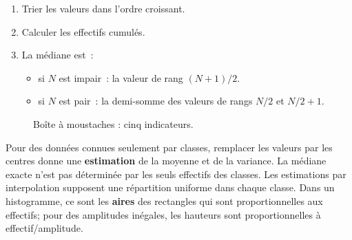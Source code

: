 \begin{methode}
\begin{enumerate}
  \item Trier les valeurs dans l'ordre croissant.
  \item Calculer les effectifs cumul\'es.
  \item La m\'ediane est~:
    \begin{itemize}
      \item si $N$ est impair~: la valeur de rang $(N+1)/2$.
      \item si $N$ est pair~: la demi-somme des valeurs de rangs $N/2$ et $N/2+1$.
    \end{itemize}
\end{enumerate}
\end{methode}

\begin{figure}[H]
\centering
{}
\caption{\ExtensionTTen{} Bo\^ite \`a moustaches : cinq indicateurs.}
\end{figure}

\begin{remarque}
Pour des donn\'ees connues seulement par classes, remplacer les valeurs par
les centres donne une \textbf{estimation} de la moyenne et de la variance.
La m\'ediane exacte n'est pas d\'etermin\'ee par les seuls effectifs des classes.
Les estimations par interpolation supposent une r\'epartition uniforme dans
chaque classe. Dans un histogramme, ce sont les \textbf{aires} des rectangles
qui sont proportionnelles aux effectifs; pour des amplitudes in\'egales,
les hauteurs sont proportionnelles \`a effectif/amplitude.
\end{remarque}

